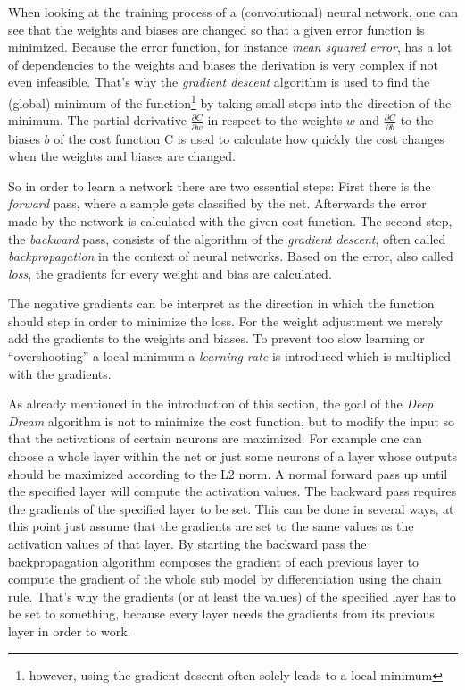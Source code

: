 When looking at the training process of a (convolutional) neural network, one can see that the weights and biases are changed so that a given error function is minimized.
Because the error function, for instance \emph{mean squared error}, has a lot of dependencies to the weights and biases the derivation is very complex if not even infeasible.
That's why the \emph{gradient descent} algorithm is used to find the (global) minimum of the function\footnote{however, using the gradient descent often solely leads to a local minimum} by taking small steps into the direction of the minimum.
The partial derivative $\frac{\partial C}{\partial w}$ in respect to the weights $w$ and $\frac{\partial C}{\partial b}$ to the biases $b$ of the cost function C is used to calculate how quickly the cost changes when the weights and biases are changed.

So in order to learn a network there are two essential steps:
First there is the \emph{forward} pass, where a sample gets classified by the net.
Afterwards the error made by the network is calculated with the given cost function.
The second step, the \emph{backward} pass, consists of the algorithm of the \emph{gradient descent}, often called \emph{backpropagation} in the context of neural networks.
Based on the error, also called \emph{loss}, the gradients for every weight and bias are calculated.

The negative gradients can be interpret as the direction in which the function should step in order to minimize the loss.
For the weight adjustment we merely add the gradients to the weights and biases.
To prevent too slow learning or \enquote{overshooting} a local minimum a \emph{learning rate} is introduced which is multiplied with the gradients.

As already mentioned in the introduction of this section, the goal of the \emph{Deep Dream} algorithm is not to minimize the cost function, but to modify the input so that the activations of certain neurons are maximized.
For example one can choose a whole layer within the net or just some neurons of a layer whose outputs should be maximized according to the L2 norm.
A normal forward pass up until the specified layer will compute the activation values.
The backward pass requires the gradients of the specified layer to be set.
This can be done in several ways, at this point just assume that the gradients are set to the same values as the activation values of that layer.
By starting the backward pass the backpropagation algorithm composes the gradient of each previous layer to compute the gradient of the whole sub model by differentiation using the chain rule.\cite{caffe-backward}
That's why the gradients (or at least the values) of the specified layer has to be set to something, because every layer needs the gradients from its previous layer in order to work.



